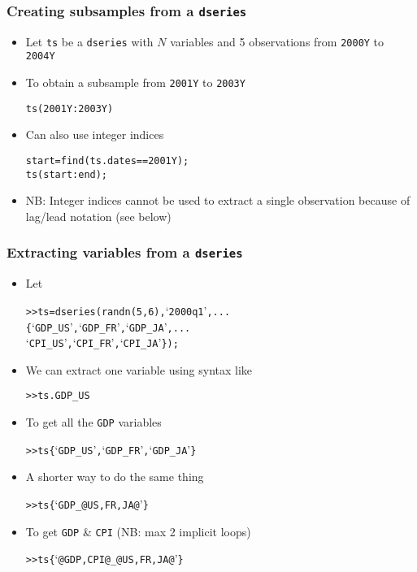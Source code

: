 \documentclass[10pt]{beamer}
\newcommand{\myitem}{\item[$\bullet$]}
\begin{document}
\begin{frame}[fragile,t]
  \frametitle{Creating subsamples from a \texttt{dseries}}
  \begin{itemize}
    \myitem Let \texttt{ts} be a \texttt{dseries} with $N$ variables and 5
    observations from \texttt{2000Y} to \texttt{2004Y}
    \myitem To obtain a subsample from \texttt{2001Y} to \texttt{2003Y}
    \begin{alltt}
  ts(2001Y:2003Y)
    \end{alltt}
    \myitem Can also use integer indices
    \begin{alltt}
  start = find(ts.dates==2001Y);
  ts(start:end);
    \end{alltt}
    \myitem NB: Integer indices cannot be used to extract a single observation
    because of lag/lead notation (see below)
  \end{itemize}
\end{frame}



\begin{frame}[fragile,t]
  \frametitle{Extracting variables from a \texttt{dseries}}
  \begin{itemize}
    \myitem Let
    \begin{alltt}
  >> ts = dseries(randn(5,6), `2000q1', ...
                 \{`GDP_US', `GDP_FR', `GDP_JA', ...
                  `CPI_US', `CPI_FR', `CPI_JA'\});
    \end{alltt}
    \myitem We can extract one variable using syntax like
    \begin{alltt}
  >> ts.GDP_US
    \end{alltt}
    \myitem To get all the \texttt{GDP} variables
    \begin{alltt}
  >> ts\{`GDP_US', `GDP_FR', `GDP_JA'\}
    \end{alltt}
    \myitem A shorter way to do the same thing
    \begin{alltt}
  >> ts\{`GDP_@US,FR,JA@'\}
    \end{alltt}
    \myitem To get \texttt{GDP} \& \texttt{CPI} (NB: max 2 implicit loops)
    \begin{alltt}
  >> ts\{`@GDP,CPI@_@US,FR,JA@'\}
    \end{alltt}
  \end{itemize}
\end{frame}
\end{document}
